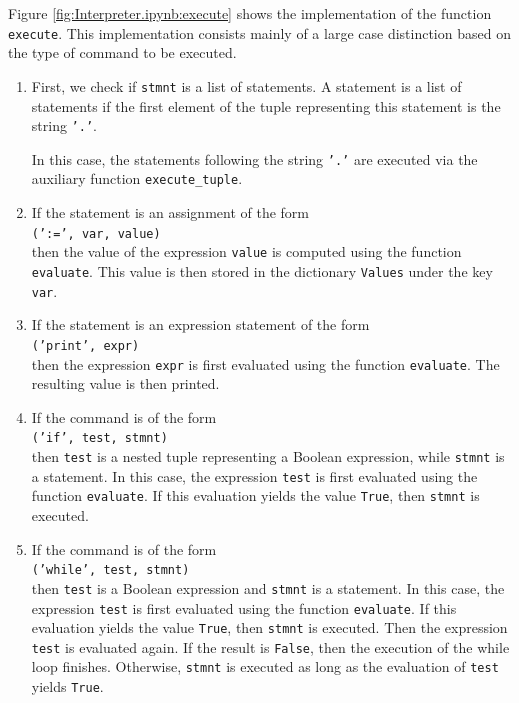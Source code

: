 Figure \ref{fig:Interpreter.ipynb:execute} shows the implementation of the function \texttt{execute}. This
implementation consists mainly of a large case distinction based on the type of command to be executed.
\begin{enumerate}
\item First, we check if \texttt{stmnt} is a list of statements. A statement is a list of statements
      if the first element of the tuple representing this statement is the string \texttt{'.'}.

      In this case, the statements following the string \texttt{'.'} are executed via the auxiliary function
      \texttt{execute\_tuple}. 
\item If the statement is an assignment of the form
      \\[0.2cm]
      \hspace*{1.3cm}
      \texttt{(':=', var, value)}
      \\[0.2cm]   
      then the value of the expression \texttt{value} is computed using the function \texttt{evaluate}.
      This value is then stored in the dictionary \texttt{Values} under the key \texttt{var}.
\item If the statement is an expression statement of the form
      \\[0.2cm]
      \hspace*{1.3cm}
      \texttt{('print', expr)}
      \\[0.2cm]
      then the expression \texttt{expr} is first evaluated using the function \texttt{evaluate}.
      The resulting value is then printed.
\item If the command is of the form
      \\[0.2cm]
      \hspace*{1.3cm}
      \texttt{('if', test, stmnt)}
      \\[0.2cm]
      then \texttt{test} is a nested tuple representing a Boolean expression, while \texttt{stmnt} is a statement.
      In this case, the expression \texttt{test} is first evaluated using the function \texttt{evaluate}.
      If this evaluation yields the value \texttt{True}, then \texttt{stmnt} is executed.
\item If the command is of the form
      \\[0.2cm]
      \hspace*{1.3cm}
      \texttt{('while', test, stmnt)}
      \\[0.2cm]
      then \texttt{test} is a Boolean expression and \texttt{stmnt} is a statement.
      In this case, the expression \texttt{test} is first evaluated using the function \texttt{evaluate}.
      If this evaluation yields the value \texttt{True}, then \texttt{stmnt} is executed.
      Then the expression \texttt{test} is evaluated again. If the result is
      \texttt{False}, then the execution of the while loop finishes.  Otherwise,
      \texttt{stmnt} is executed as long as the evaluation of \texttt{test}
      yields \texttt{True}.
\end{enumerate}



